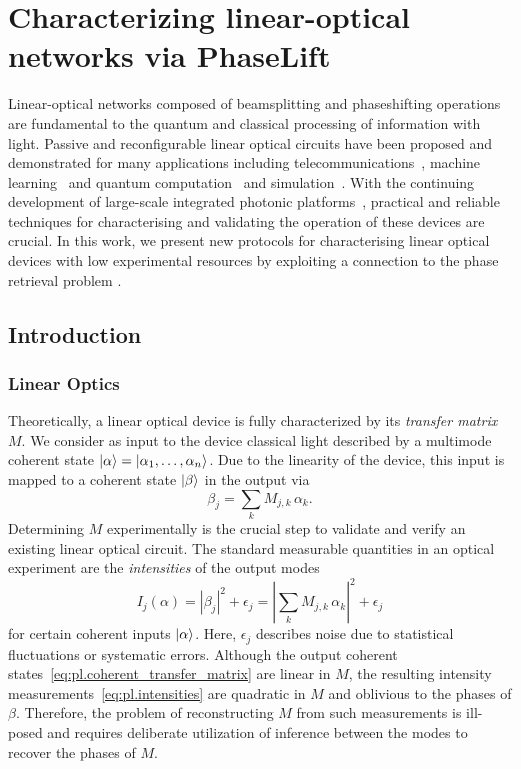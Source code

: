 \chapter{Characterizing linear-optical networks via PhaseLift}%
\label{chap:phaselift}




Linear-optical networks composed of beamsplitting and phaseshifting operations are fundamental to the quantum and classical processing of information with light.
Passive and reconfigurable linear optical circuits have been proposed and demonstrated for many applications including telecommunications~\cite{Miller_2015_Sorting}, machine learning~\cite{Shen_2017_Deep} and quantum computation~\cite{Carolan_2015_Universal} and simulation~\cite{Harris_2017_Quantum}.
With the continuing development of large-scale integrated photonic platforms~\cite{Silverstone_2016_Silicon,Seok_2016_LargeScale}, practical and reliable techniques for characterising and validating the operation of these devices are crucial.
In this work, we present new protocols for characterising linear optical devices with low experimental resources by exploiting a connection to the phase retrieval problem \cite{Walther_1963_Question}.

\section{Introduction}
\subsection{Linear Optics}

Theoretically, a linear optical device is fully characterized by its \emph{transfer matrix} ${M}$.
We consider as input to the device classical light described by a multimode coherent state $\ket{{\alpha}} = \ket{\alpha_1, \ldots, \alpha_n}$.
Due to the linearity of the device, this input is mapped to a coherent state $\ket{{\beta}}$ in the output via
\[
  \beta_j = \sum_k M_{j,k} \,\alpha_k.
  \label{eq:pl.coherent_transfer_matrix}
\]
Determining ${M}$ experimentally is the crucial step to validate and verify an existing linear optical circuit.
The standard measurable quantities in an optical experiment are the \emph{intensities} of the output modes
\[
  I_j({\alpha})
  = \left| \beta_j \right|^2 + \epsilon_j
  = \left| \sum_k M_{j,k} \, \alpha_k \right|^2 + \epsilon_j
  \label{eq:pl.intensities}
\]
for certain coherent inputs $\ket{{\alpha}}$.
Here, $\epsilon_j$ describes noise due to statistical fluctuations or systematic errors.
Although the output coherent states~\eqref{eq:pl.coherent_transfer_matrix} are linear in ${M}$, the resulting intensity measurements~\eqref{eq:pl.intensities} are quadratic in ${M}$ and oblivious to the phases of $\beta$.
Therefore, the problem of reconstructing ${M}$ from such measurements is ill-posed and requires deliberate utilization of inference between the modes to recover the phases of $M$.

